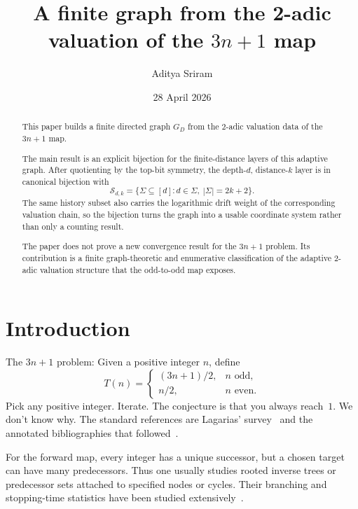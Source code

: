 \documentclass[11pt]{amsart}
\title{A finite graph from the 2-adic valuation of the \texorpdfstring{$3n+1$}{3n+1} map}
\author{Aditya Sriram}
\date{28 April 2026}
\theoremstyle{definition}
\theoremstyle{remark}
\newcommand{\Sfam}{\mathcal S}
\begin{document}
\begin{abstract}
\setlength{\parskip}{0.55em plus 0.1em minus 0.05em} 
\setlength{\parindent}{0pt} 
This paper builds a finite directed graph $G_D$ from the $2$-adic valuation
data of the $3n+1$ map.

The main result is an explicit bijection for the finite-distance layers of
this adaptive graph.  After quotienting by the top-bit symmetry, the
depth-$d$, distance-$k$ layer is in canonical bijection with
\[
\Sfam_{d,k}
=
\{\Sigma\subseteq[d]:d\in\Sigma,\ |\Sigma|=2k+2\}.
\]
The same history subset also carries the logarithmic drift weight of the
corresponding valuation chain, so the bijection turns the graph into a
usable coordinate system rather than only a counting result.

The paper does not prove a new convergence result for the $3n+1$ problem.
Its contribution is a finite graph-theoretic and enumerative classification
of the adaptive $2$-adic valuation structure that the odd-to-odd map exposes.
\end{abstract}
\maketitle

\section{Introduction}\label{sec:introduction}
The $3n+1$ problem: Given a positive integer $n$, define
\[
T(n)=
\begin{cases}
(3n+1)/2, & n\text{ odd},\\
n/2, & n\text{ even}.
\end{cases}
\]
Pick any positive integer.  Iterate.  The conjecture is that you always
reach~$1$.  We don't know why.  The standard references are Lagarias'
survey~\cite{Lagarias1985} and the annotated bibliographies that
followed~\cite{LagariasAnnotated1999, LagariasAnnotated2009, Lagarias2010}.

For the forward map, every integer has a unique successor, but a
chosen target can have many predecessors.  Thus one usually studies rooted
inverse trees or predecessor sets attached to specified nodes or cycles.  Their
branching and stopping-time statistics have been studied
extensively~\cite{ApplegateLagarias1995, ApplegateLagarias2003, Wirsching1998}.
\end{document}
